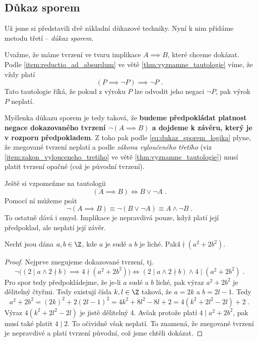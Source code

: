 \subsection{Důkaz sporem}\label{subsec:dukaz_sporem}
Už jsme si představili dvě základní důkazové techniky. Nyní k nim přidáme metodu třetí -- \emph{důkaz sporem}.\par
Uvažme, že máme tvrzení ve tvaru implikace $A \implies B$, které chceme dokázat. Podle \ref{item:reductio_ad_absurdum} ve větě \ref{thm:vyznamne_tautologie} víme, že vždy platí
\begin{equation}\label{eq:dukaz_sporem_logika}
    (P \implies \neg P) \implies \neg P\; .
\end{equation}
Tato tautologie říká, že pokud z výroku $P$ lze odvodit jeho negaci $\neg P$, pak výrok $P$ neplatí.\par
Myšlenka důkazu sporem je tedy taková, že \textbf{budeme předpokládat platnost negace dokazovaného tvrzení $\neg (A \implies B)$ a dojdeme k závěru, který je v rozporu předpokladem}. Z toho pak podle \eqref{eq:dukaz_sporem_logika} plyne, že znegované tvrzení neplatí a podle \emph{zákona vyloučeného třetího} (viz \ref{item:zakon_vylouceneho_tretiho} ve větě \ref{thm:vyznamne_tautologie}) musí platit tvrzení opačné (což je původní tvrzení).\par
Ještě si vzpomeňme na tautologii
\begin{equation*}
    (A \implies B) \iff B \lor \neg A\; .
\end{equation*}
Pomocí ní můžeme psát
\begin{equation*}
    \neg (A \implies B) \equiv \neg (B \lor \neg A) \equiv A \land \neg B\; .
\end{equation*}
To ostatně dává i smysl. Implikace je nepravdivá pouze, když platí její předpoklad, ale neplatí její závěr.
\begin{assertion}
    Nechť jsou dána $a,b\in\Z$, kde $a$ je sudé a $b$ je liché. Pak\linebreak $4 \nmid (a^2+2b^2)$.
\end{assertion}
\begin{proof}
    Nejprve znegujeme dokazované tvrzení, tj.
    \begin{equation*}
        \neg \big((2 \mid a \land 2 \nmid b) \implies 4 \nmid (a^2+2b^2)\big) \iff (2 \mid a \land 2 \nmid b) \land 4 \mid (a^2+2b^2)\; .
    \end{equation*}
    Pro spor tedy předpokládejme, že je-li $a$ sudé a $b$ liché, pak výraz $a^2+2b^2$ je dělitelný čtyřmi. Tedy existují čísla $k,l\in\Z$ taková, že $a=2k$ a $b=2l-1$. Tedy
    \begin{equation*}
        a^2+2b^2=(2k)^2+2(2l-1)^2=4k^2+8l^2-8l+2=4(k^2+2l^2-2l)+2\; .
    \end{equation*}
    Výraz $4(k^2+2l^2-2l)$ je jistě dělitelný 4. Avšak protože platí $4 \mid a^2+2b^2$, pak musí také platit $4 \mid 2$. To očividně však neplatí. To znamená, že znegované tvrzení je nepravdivé a platí tvrzení původní, což jsme chtěli dokázat.
\end{proof}
